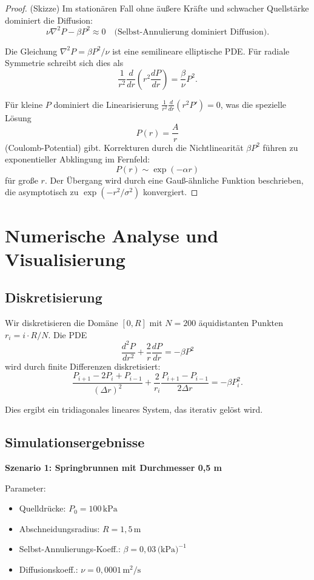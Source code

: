\documentclass[a4paper,12pt]{article}
\theoremstyle{definition}
\begin{document}
\begin{proof}
(Skizze) Im stationären Fall ohne äußere Kräfte und schwacher Quellstärke dominiert die Diffusion:
\[
\nu \nabla^2 P - \beta P^2 \approx 0 \quad \text{(Selbst-Annulierung dominiert Diffusion)}.
\]

Die Gleichung $\nabla^2 P = \beta P^2 / \nu$ ist eine semilineare elliptische PDE. Für radiale Symmetrie schreibt sich dies als
\[
\frac{1}{r^2} \frac{d}{dr}\left(r^2 \frac{dP}{dr}\right) = \frac{\beta}{\nu} P^2.
\]

Für kleine $P$ dominiert die Linearisierung $\frac{1}{r^2} \frac{d}{dr}(r^2 P') = 0$, was die spezielle Lösung
\[
P(r) = \frac{A}{r}
\]
(Coulomb-Potential) gibt. Korrekturen durch die Nichtlinearität $\beta P^2$ führen zu exponentieller Abklingung im Fernfeld:
\[
P(r) \sim \exp(-\alpha r)
\]
für große $r$. Der Übergang wird durch eine Gauß-ähnliche Funktion beschrieben, die asymptotisch zu $\exp(-r^2/\sigma^2)$ konvergiert.
\end{proof}

\section{Numerische Analyse und Visualisierung}

\subsection{Diskretisierung}

Wir diskretisieren die Domäne $[0, R]$ mit $N=200$ äquidistanten Punkten $r_i = i \cdot R / N$. Die PDE
\[
\frac{d^2 P}{dr^2} + \frac{2}{r} \frac{dP}{dr} = -\beta P^2
\]
wird durch finite Differenzen diskretisiert:
\[
\frac{P_{i+1} - 2P_i + P_{i-1}}{(\Delta r)^2} + \frac{2}{r_i} \frac{P_{i+1} - P_{i-1}}{2 \Delta r} = -\beta P_i^2.
\]

Dies ergibt ein tridiagonales lineares System, das iterativ gelöst wird.

\subsection{Simulationsergebnisse}

\textbf{Szenario 1: Springbrunnen mit Durchmesser 0,5 m}

Parameter:
\begin{itemize}
	\item Quelldrücke: $P_0 = 100 \, \text{kPa}$
	\item Abschneidungsradius: $R = 1{,}5 \, \text{m}$
	\item Selbst-Annulierungs-Koeff.: $\beta = 0{,}03 \, \text{(kPa)}^{-1}$
	\item Diffusionskoeff.: $\nu = 0{,}0001 \, \text{m}^2/\text{s}$
\end{itemize}
\end{document}
